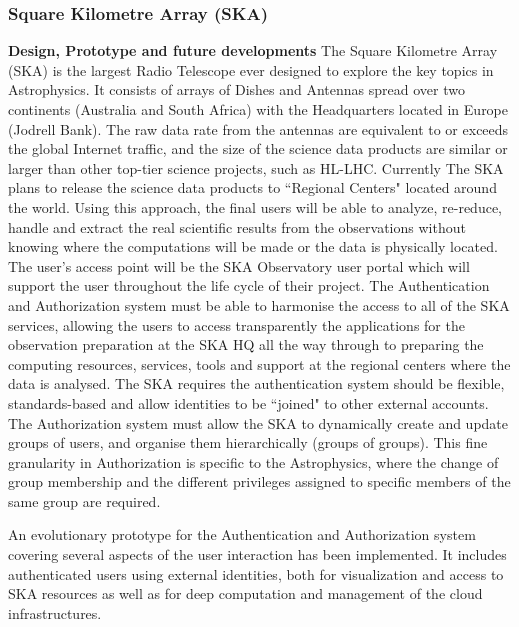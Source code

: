 \documentclass[fleqn,10pt]{wlscirep}
\begin{document}
{\subsubsection{Square Kilometre Array (SKA)}
\textbf{Design, Prototype and future developments}
The Square Kilometre Array (SKA) is the largest Radio Telescope ever designed to explore the key  topics in Astrophysics. It consists of arrays of Dishes and Antennas spread over two continents (Australia and South Africa) with the Headquarters located in Europe (Jodrell Bank). The  raw data rate from the antennas are equivalent to or exceeds the global Internet traffic, and the size of the science data products are similar or larger than other top-tier science projects, such as HL-LHC.  Currently The SKA plans to release the science data products to ``Regional Centers" located around the world. Using this approach, the final users will be able to analyze, re-reduce, handle and extract the real scientific results from the observations without knowing where the computations will be made or the data is physically located. The user’s access point will be the SKA Observatory user portal which will support the user throughout the life cycle of their project.  The Authentication and Authorization system must be able to harmonise the access to all of the SKA services, allowing the users  to access transparently the applications for the observation preparation at the SKA HQ all the way through to preparing the computing resources, services, tools and support at the regional centers where the data is analysed. The SKA requires  the authentication system should be flexible, standards-based and allow identities to be  ``joined" to other external accounts. The Authorization system must allow the SKA to dynamically create and update groups of users, and organise them  hierarchically  (groups of groups). This fine granularity in Authorization is specific to the Astrophysics, where the change of group membership and the different privileges assigned to specific members of the same group are required. 

An evolutionary prototype for the Authentication and Authorization system covering several aspects of the user interaction has been implemented. It includes authenticated users using external identities, both for visualization and access to SKA resources as well as for deep computation and management of the cloud infrastructures. 

}
\end{document}
